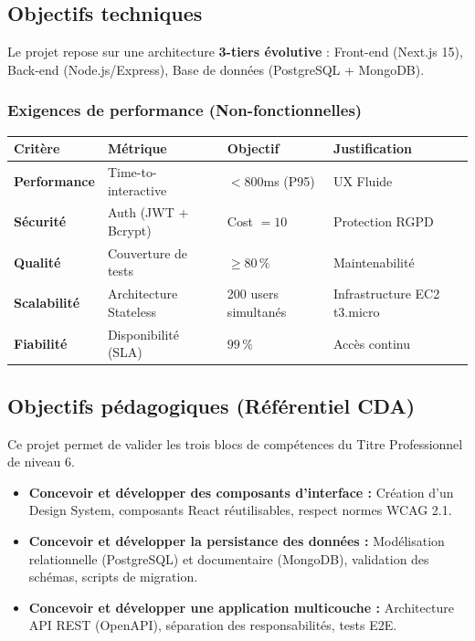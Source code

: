 \subsection{Objectifs techniques}

Le projet repose sur une architecture \textbf{3-tiers évolutive} : Front-end (Next.js 15), Back-end (Node.js/Express), Base de données (PostgreSQL + MongoDB).

\subsubsection{Exigences de performance (Non-fonctionnelles)}

\begin{center}
\small
\begin{tabular}{|p{}|p{}|p{}|p{}|}
\hline
\textbf{Critère} & \textbf{Métrique} & \textbf{Objectif} & \textbf{Justification} \\
\hline
\textbf{Performance} & Time-to-interactive & $< 800$ms (P95) & UX Fluide \\
\hline
\textbf{Sécurité} & Auth (JWT + Bcrypt) & Cost $= 10$ & Protection RGPD \\
\hline
\textbf{Qualité} & Couverture de tests & $\geq 80\,\%$ & Maintenabilité \\
\hline
\textbf{Scalabilité} & Architecture Stateless & 200 users simultanés & Infrastructure EC2 t3.micro \\
\hline
\textbf{Fiabilité} & Disponibilité (SLA) & $99\,\%$ & Accès continu \\
\hline
\end{tabular}
\end{center}

\subsection{Objectifs pédagogiques (Référentiel CDA)}

Ce projet permet de valider les trois blocs de compétences du Titre Professionnel de niveau 6.

\begin{itemize}
    \item \textbf{Concevoir et développer des composants d'interface :} Création d'un Design System, composants React réutilisables, respect normes WCAG 2.1.
    \item \textbf{Concevoir et développer la persistance des données :} Modélisation relationnelle (PostgreSQL) et documentaire (MongoDB), validation des schémas, scripts de migration.
    \item \textbf{Concevoir et développer une application multicouche :} Architecture API REST (OpenAPI), séparation des responsabilités, tests E2E.
\end{itemize}

